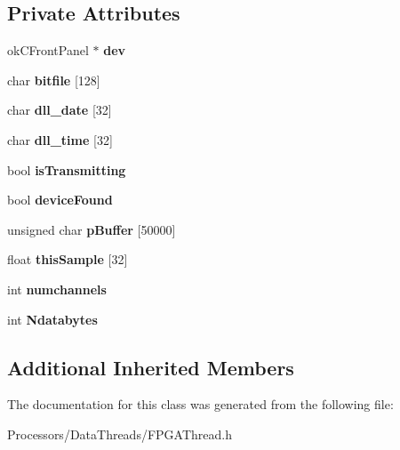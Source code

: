 \subsection*{Private Attributes}
\begin{DoxyCompactItemize}
\item 
\hypertarget{classFPGAThread_aefc8169fcf432084604e668bdd002e33}{ok\-C\-Front\-Panel $\ast$ {\bfseries dev}}\label{classFPGAThread_aefc8169fcf432084604e668bdd002e33}

\item 
\hypertarget{classFPGAThread_afcdaa6785c45d61e82dacace5271d148}{char {\bfseries bitfile} \mbox{[}128\mbox{]}}\label{classFPGAThread_afcdaa6785c45d61e82dacace5271d148}

\item 
\hypertarget{classFPGAThread_ad945f39bbd0160eb7671fc056698fc6f}{char {\bfseries dll\-\_\-date} \mbox{[}32\mbox{]}}\label{classFPGAThread_ad945f39bbd0160eb7671fc056698fc6f}

\item 
\hypertarget{classFPGAThread_a9d02817493e33881ef5850ebb42dce22}{char {\bfseries dll\-\_\-time} \mbox{[}32\mbox{]}}\label{classFPGAThread_a9d02817493e33881ef5850ebb42dce22}

\item 
\hypertarget{classFPGAThread_ad4248ed5641cb562fb70d80276e3c5a6}{bool {\bfseries is\-Transmitting}}\label{classFPGAThread_ad4248ed5641cb562fb70d80276e3c5a6}

\item 
\hypertarget{classFPGAThread_a3ee2a5e5baa7812c17f8005f6dd7fed0}{bool {\bfseries device\-Found}}\label{classFPGAThread_a3ee2a5e5baa7812c17f8005f6dd7fed0}

\item 
\hypertarget{classFPGAThread_a85e1ec77b3726177ec431524e1bd73bc}{unsigned char {\bfseries p\-Buffer} \mbox{[}50000\mbox{]}}\label{classFPGAThread_a85e1ec77b3726177ec431524e1bd73bc}

\item 
\hypertarget{classFPGAThread_a26b6ea54b00046051beb3ab6d0d28181}{float {\bfseries this\-Sample} \mbox{[}32\mbox{]}}\label{classFPGAThread_a26b6ea54b00046051beb3ab6d0d28181}

\item 
\hypertarget{classFPGAThread_a076e7ac64107a0a51a6623e278a81914}{int {\bfseries numchannels}}\label{classFPGAThread_a076e7ac64107a0a51a6623e278a81914}

\item 
\hypertarget{classFPGAThread_a7d3d6dd86acd3f747ed60c88d133aa15}{int {\bfseries Ndatabytes}}\label{classFPGAThread_a7d3d6dd86acd3f747ed60c88d133aa15}

\end{DoxyCompactItemize}
\subsection*{Additional Inherited Members}


The documentation for this class was generated from the following file\-:\begin{DoxyCompactItemize}
\item 
Processors/\-Data\-Threads/F\-P\-G\-A\-Thread.\-h\end{DoxyCompactItemize}
